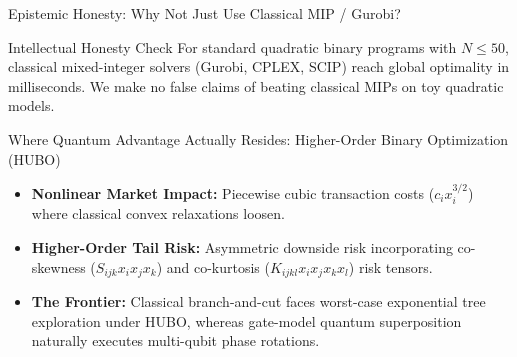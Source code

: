 \documentclass[aspectratio=169,10pt]{beamer}
\begin{document}
\begin{frame}{Epistemic Honesty: Why Not Just Use Classical MIP / Gurobi?}
\begin{alertblock}{Intellectual Honesty Check}
For standard quadratic binary programs with $N \le 50$, classical mixed-integer solvers (Gurobi, CPLEX, SCIP) reach global optimality in milliseconds. We make no false claims of beating classical MIPs on toy quadratic models.
\end{alertblock}

\vspace{0.2cm}
\begin{block}{Where Quantum Advantage Actually Resides: Higher-Order Binary Optimization (HUBO)}
\begin{itemize}
    \item \textbf{Nonlinear Market Impact:} Piecewise cubic transaction costs ($c_i x_i^{3/2}$) where classical convex relaxations loosen.
    \item \textbf{Higher-Order Tail Risk:} Asymmetric downside risk incorporating co-skewness ($S_{ijk} x_i x_j x_k$) and co-kurtosis ($K_{ijkl} x_i x_j x_k x_l$) risk tensors.
    \item \textbf{The Frontier:} Classical branch-and-cut faces worst-case exponential tree exploration under HUBO, whereas gate-model quantum superposition naturally executes multi-qubit phase rotations.
\end{itemize}
\end{block}
\end{frame}
\end{document}
